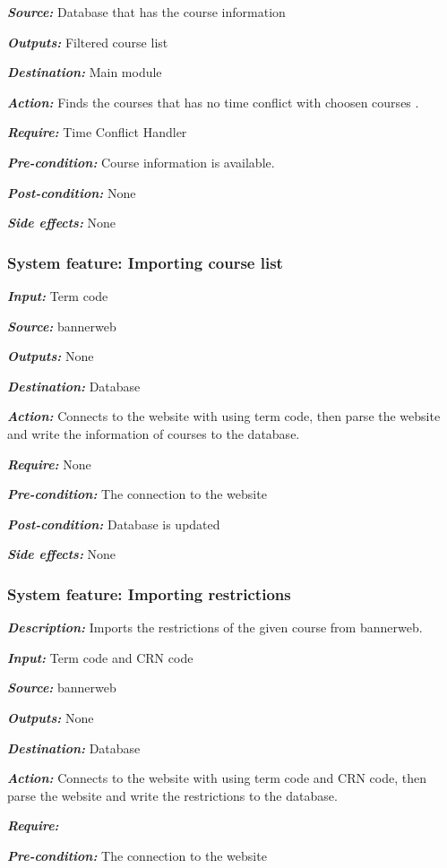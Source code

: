 \documentclass[twoside,letterpaper]{article}
\newcommand{\featuresection}[1] {
\subsubsection[System feature: #1]{\selectlanguage{english}\rmfamily\bfseries\color{black} System feature: #1}
}
\begin{document}
{\emph{\textbf{Source:}} Database that has the course information

\emph{\textbf{Outputs:}} Filtered course list

\emph{\textbf{Destination:}} Main module

\emph{\textbf{Action:}} Finds the courses that has no time conflict with choosen courses .

\emph{\textbf{Require:}} Time Conflict Handler

\emph{\textbf{Pre-condition: }} Course information is available.

\emph{\textbf{Post-condition: }} None

\emph{\textbf{Side effects:}} None



\featuresection{Importing course list}
\label{sssec:importCourse}

\emph{\textbf{Input:}}  Term code

\emph{\textbf{Source:}} bannerweb

\emph{\textbf{Outputs:}} None

\emph{\textbf{Destination:}} Database

\emph{\textbf{Action:}} Connects to the website with using term code, then parse the website and write the information of courses to the database.  

\emph{\textbf{Require:}} None

\emph{\textbf{Pre-condition: }} The connection to the website

\emph{\textbf{Post-condition: }} Database is updated

\emph{\textbf{Side effects:}} None



\featuresection{Importing restrictions}
\label{sssec:importRestrictions}

\emph{\textbf{Description:}} Imports the restrictions of the given course from bannerweb.

\emph{\textbf{Input:}}  Term code and CRN code

\emph{\textbf{Source:}} bannerweb

\emph{\textbf{Outputs:}} None

\emph{\textbf{Destination:}} Database

\emph{\textbf{Action:}} Connects to the website with using term code and CRN code, then parse the website and write the restrictions to the database.  

\emph{\textbf{Require:}}

\emph{\textbf{Pre-condition: }} The connection to the website

}
\end{document}
